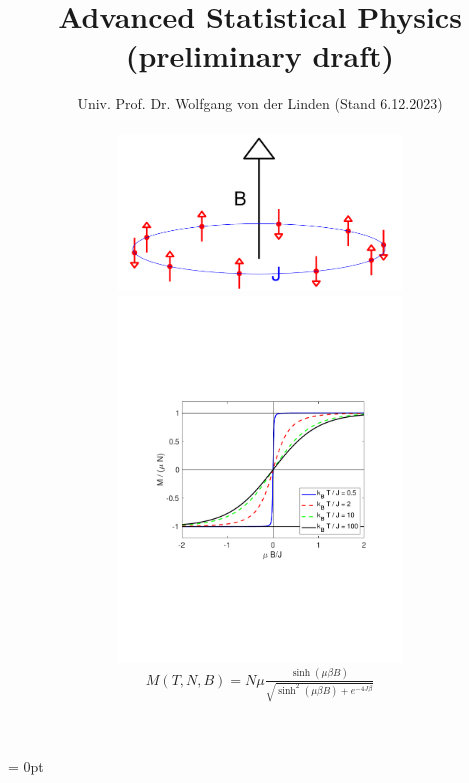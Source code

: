 \documentclass[12pt,openany]{book}
\begin{document}
\title{Advanced Statistical Physics\\(preliminary draft)}
\author{Univ. Prof. Dr. Wolfgang von der Linden
\hfill(Stand 6.12.2023)\\
\hline\\[1.5cm]
\includegraphics[width=7.5cm]{ising_spins}
 \includegraphics[width=7.5cm]{ising}\\[1.5cm]
$M(T,N,B) = N \mu \frac{\sinh(\mu \beta B)}{\sqrt{\sinh^{2}(\mu\beta B) + e^{-4 J \beta}}}$
\\[2.5cm]}
\parindent = 0pt
\maketitle
\newpage
\setcounter{page}{1}
\tableofcontents

%
%
%
%
	
	

	    



\end{document}
